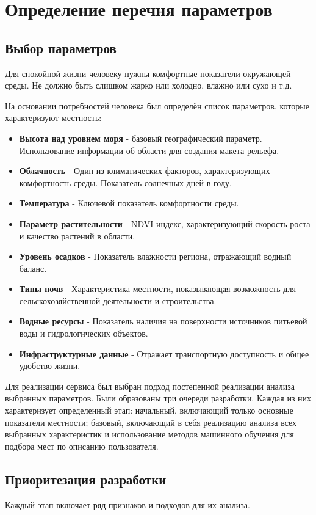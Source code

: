 \chapter{Определение перечня параметров}
\section{Выбор параметров}
Для спокойной жизни человеку нужны комфортные показатели окружающей среды\cite{Minniabaev2012}. 
Не должно быть слишком жарко или холодно, влажно или сухо и т.д.

На основании потребностей человека был определён список параметров, которые характеризуют местность:
\begin{itemize}
	\item \textbf{Высота над уровнем моря} - базовый географический параметр. Использование информации  об области для создания макета рельефа.
	\item \textbf{Облачность} - Один из климатических факторов, характеризующих комфортность среды. Показатель солнечных дней в году.
	\item \textbf{Температура} - Ключевой показатель комфортности среды.
	\item \textbf{Параметр растительности} - NDVI-индекс\cite{Cherepanov2011}, характеризующий скорость роста и качество растений в области.
	\item \textbf{Уровень осадков} - Показатель влажности региона, отражающий водный баланс.
	\item \textbf{Типы почв} - Характеристика местности, показывающая возможность для сельскохозяйственной деятельности и строительства.
	\item \textbf{Водные ресурсы} - Показатель наличия на поверхности источников питьевой воды и гидрологических объектов.
	\item \textbf{Инфраструктурные данные} - Отражает транспортную доступность и общее удобство жизни.
\end{itemize}

Для реализации сервиса был выбран подход постепенной реализации анализа выбранных параметров.
Были образованы три очереди разработки. 
Каждая из них характеризует определенный этап: начальный, включающий только основные показатели местности;  базовый, включающий в себя реализацию анализа всех выбранных характеристик и использование методов машинного обучения для подбора мест по описанию пользователя.
\newpage
\section{Приоритезация разработки}
Каждый этап включает ряд признаков и подходов для их анализа.

